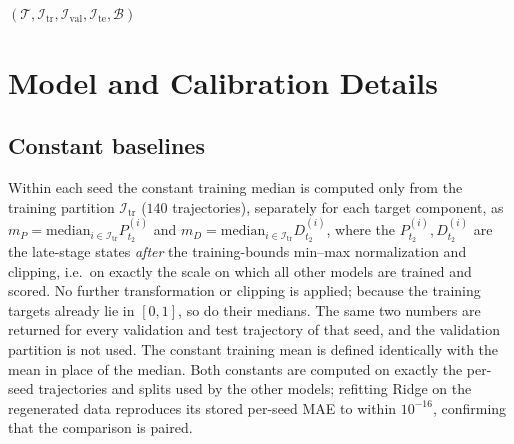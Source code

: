\documentclass[10pt,journal,compsoc]{IEEEtran}
\begin{document}
\begin{algorithm}[!t]
\BlankLine
{}
\BlankLine
\Return $(\mathcal{T},\mathcal{I}_{\mathrm{tr}},\mathcal{I}_{\mathrm{val}},\mathcal{I}_{\mathrm{te}},\mathcal{B})$
\end{algorithm}

\section{Model and Calibration Details}
\label{sup:models}

\subsection{Constant baselines}
Within each seed the constant training median is computed only from the training partition $\mathcal{I}_{\mathrm{tr}}$ ($140$ trajectories), separately for each target component, as $m_P=\mathrm{median}_{i\in\mathcal{I}_{\mathrm{tr}}}P^{(i)}_{t_2}$ and $m_D=\mathrm{median}_{i\in\mathcal{I}_{\mathrm{tr}}}D^{(i)}_{t_2}$, where the $P^{(i)}_{t_2},D^{(i)}_{t_2}$ are the late-stage states \emph{after} the training-bounds min--max normalization and clipping, i.e.\ on exactly the scale on which all other models are trained and scored. No further transformation or clipping is applied; because the training targets already lie in $[0,1]$, so do their medians. The same two numbers are returned for every validation and test trajectory of that seed, and the validation partition is not used. The constant training mean is defined identically with the mean in place of the median. Both constants are computed on exactly the per-seed trajectories and splits used by the other models; refitting Ridge on the regenerated data reproduces its stored per-seed MAE to within $10^{-16}$, confirming that the comparison is paired.
\end{document}
